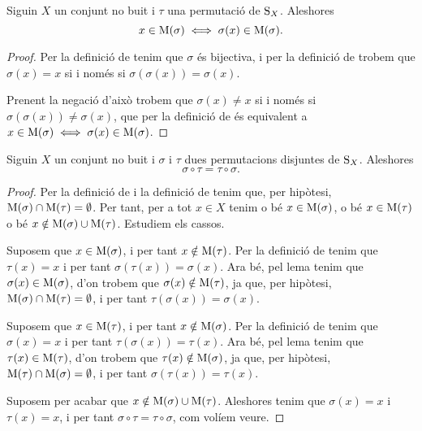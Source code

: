 \documentclass[../../Main.tex]{subfiles}
\begin{document}
	\begin{lemma}
		\label{lema:permutacions disjuntes commuten}
		Siguin \(X\) un conjunt no buit i \(\tau\) una permutació de \(\operatorname{S}_{X}\). Aleshores
		\[x\in\operatorname{M}(\sigma)\iff\sigma(x)\in\operatorname{M}(\sigma).\]
		\begin{proof} %
			Per la definició de  tenim que \(\sigma\) és bijectiva, i per la definició de  trobem que \(\sigma(x)=x\) si i només si \(\sigma(\sigma(x))=\sigma(x)\).
			
			Prenent la negació d'això trobem que \(\sigma(x)\neq x\) si i només si \(\sigma(\sigma(x))\neq\sigma(x)\), que per la definició de  és equivalent a \(x\in\operatorname{M}(\sigma)\iff\sigma(x)\in\operatorname{M}(\sigma)\).
		\end{proof}
	\end{lemma}
	\begin{theorem}
		\label{thm:permutacions disjuntes commuten}
		Siguin \(X\) un conjunt no buit i \(\sigma\) i \(\tau\) dues permutacions disjuntes de \(\operatorname{S}_{X}\). Aleshores
		\[\sigma\circ\tau=\tau\circ\sigma.\]
		\begin{proof}
			Per la definició de  i la definició de  tenim que, per hipòtesi, \(\operatorname{M}(\sigma)\cap\operatorname{M}(\tau)=\emptyset\). Per tant, per a tot \(x\in X\) tenim o bé \(x\in\operatorname{M}(\sigma)\), o bé \(x\in\operatorname{M}(\tau)\) o bé \(x\notin\operatorname{M}(\sigma)\cup\operatorname{M}(\tau)\). Estudiem els cassos.
			
			Suposem que \(x\in\operatorname{M}(\sigma)\), i per tant \(x\notin\operatorname{M}(\tau)\). Per la definició de  tenim que \(\tau(x)=x\) i per tant \(\sigma(\tau(x))=\sigma(x)\). Ara bé, pel lema  tenim que \(\sigma(x)\in\operatorname{M}(\sigma)\), d'on trobem que \(\sigma(x)\notin\operatorname{M}(\tau)\), ja que, per hipòtesi, \(\operatorname{M}(\sigma)\cap\operatorname{M}(\tau)=\emptyset\), i per tant \(\tau(\sigma(x))=\sigma(x)\).
			
			Suposem que \(x\in\operatorname{M}(\tau)\), i per tant \(x\notin\operatorname{M}(\sigma)\). Per la definició de  tenim que \(\sigma(x)=x\) i per tant \(\tau(\sigma(x))=\tau(x)\). Ara bé, pel lema  tenim que \(\tau(x)\in\operatorname{M}(\tau)\), d'on trobem que \(\tau(x)\notin\operatorname{M}(\sigma)\), ja que, per hipòtesi, \(\operatorname{M}(\tau)\cap\operatorname{M}(\sigma)=\emptyset\), i per tant \(\sigma(\tau(x))=\tau(x)\). %
			
			Suposem per acabar que \(x\notin\operatorname{M}(\sigma)\cup\operatorname{M}(\tau)\). Aleshores tenim que \(\sigma(x)=x\) i \(\tau(x)=x\), i per tant \(\sigma\circ\tau=\tau\circ\sigma\), com volíem veure.
		\end{proof} %
	\end{theorem}
\end{document}
